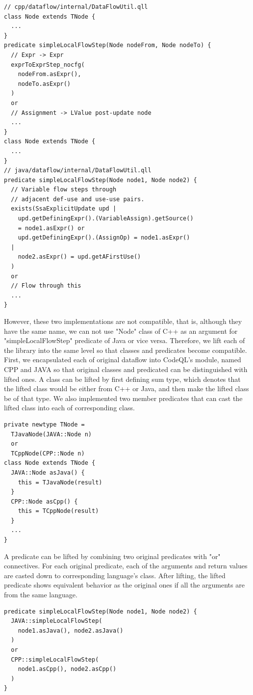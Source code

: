 \begin{lstlisting}[style=codeql,xleftmargin=2.5em]
// cpp/dataflow/internal/DataFlowUtil.qll
class Node extends TNode {
  ...
}
predicate simpleLocalFlowStep(Node nodeFrom, Node nodeTo) {
  // Expr -> Expr
  exprToExprStep_nocfg(
    nodeFrom.asExpr(),
    nodeTo.asExpr()
  )
  or
  // Assignment -> LValue post-update node
  ...
}
class Node extends TNode {
  ...
}
// java/dataflow/internal/DataFlowUtil.qll
predicate simpleLocalFlowStep(Node node1, Node node2) {
  // Variable flow steps through
  // adjacent def-use and use-use pairs.
  exists(SsaExplicitUpdate upd |
    upd.getDefiningExpr().(VariableAssign).getSource()
    = node1.asExpr() or
    upd.getDefiningExpr().(AssignOp) = node1.asExpr()
  |
    node2.asExpr() = upd.getAFirstUse()
  )
  or
  // Flow through this
  ...
}
\end{lstlisting}
However, these two implementations are not compatible, that is, although they have the same name,
we can not use "Node" class of C++ as an argument for "simpleLocalFlowStep" predicate of Java or vice versa.
Therefore, we lift each of the library into the same level so that classes and predicates become compatible.
First, we encapsulated each of original dataflow into CodeQL's module, named CPP and JAVA so that
original classes and predicated can be distinguished with lifted ones.
A class can be lifted by first defining sum type, which denotes that the lifted class would be either from C++ or
Java, and then make the lifted class be of that type. We also implemented two member predicates that can cast
the lifted class into each of corresponding class.
\begin{lstlisting}[style=codeql,xleftmargin=2.5em]
private newtype TNode =
  TJavaNode(JAVA::Node n)
  or
  TCppNode(CPP::Node n)
class Node extends TNode {
  JAVA::Node asJava() {
    this = TJavaNode(result)
  }
  CPP::Node asCpp() {
    this = TCppNode(result)
  }
  ...
}
\end{lstlisting}

A predicate can be lifted by combining two original predicates with "or"
connectives.  For each original predicate, each of the arguments and return
values are casted down to corresponding language's class. After lifting, the
lifted predicate shows equivalent behavior as the original ones if all the
arguments are from the same language.
\begin{lstlisting}[style=codeql,xleftmargin=2.5em]
predicate simpleLocalFlowStep(Node node1, Node node2) {
  JAVA::simpleLocalFlowStep(
    node1.asJava(), node2.asJava()
  )
  or
  CPP::simpleLocalFlowStep(
    node1.asCpp(), node2.asCpp()
  )
}
\end{lstlisting}
